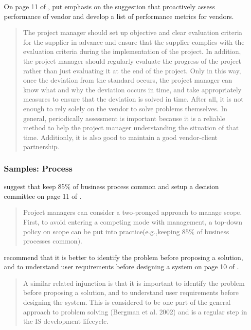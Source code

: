 On page 11 of , \citeauthor{2} put emphasis on the suggestion that proactively assess performance of vendor and develop a list of performance metrics for vendors.

\begin{quotation}
  The project manager should set up objective and clear evaluation criteria for the supplier in advance and ensure that the supplier complies with the evaluation criteria during the implementation of the project. In addition, the project manager should regularly evaluate the progress of the project rather than just evaluating it at the end of the project. Only in this way, once the deviation from the standard occurs, the project manager can know what and why the deviation occurs in time, and take appropriately measures to ensure that the deviation is solved in time. After all, it is not enough to rely solely on the vendor to solve problems themselves. In general, periodically assessment is important because it is a reliable method to help the project manager understanding the situation of that time. Additionly, it is also good to maintain a good vendor-client partnership.
\end{quotation}

\subsubsection{Samples: Process}
\citeauthor{2} suggest that keep 85\% of business process common and setup a decision committee on page 11 of .
\begin{quotation}
Project managers can consider a two-pronged approach to manage scope. First, to avoid entering a competing mode with management, a top-down policy on scope can be put into practice(e.g.,keeping 85\% of business processes common).
\end{quotation}

\citeauthor{6} recommend that it is better to identify the problem before proposing a solution, and to understand user requirements before designing a system on page 10 of .
\begin{quotation}
A similar related injunction is that it is important to identify the problem before proposing a solution, and to understand user requirements before designing the system. This is considered to be one part of the general approach to problem solving (Bergman et al. 2002) and is a regular step in the IS development lifecycle.
\end{quotation}


